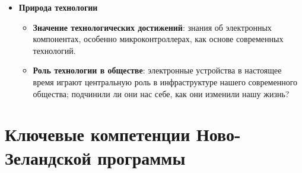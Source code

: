 \begin{itemize}
\item \textbf{Природа технологии}

\begin{itemize}

\item\textbf{Значение технологических достижений}: знания об электронных
компонентах, особенно микроконтроллерах, как основе современных технологий.

\item\textbf{Роль технологии в обществе}: электронные устройства в настоящее
время играют центральную роль в инфраструктуре нашего современного общества;
подчинили ли они нас себе, как они изменили нашу жизнь?

\end{itemize}

\end{itemize}

\section{Ключевые компетенции Ново-Зеландской программы}

